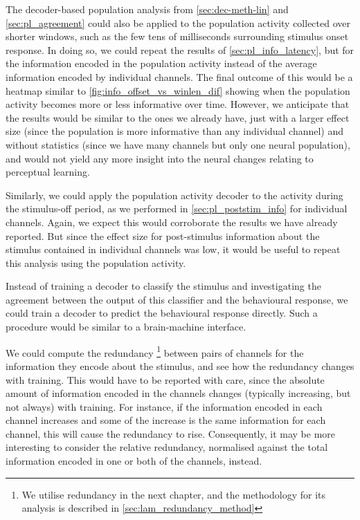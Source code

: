 The decoder-based population analysis from \autoref{sec:dec-meth-lin} and \autoref{sec:pl_agreement} could also be applied to the population activity collected over shorter windows, such as the few tens of milliseconds surrounding stimulus onset response.
In doing so, we could repeat the results of \autoref{sec:pl_info_latency}, but for the information encoded in the population activity instead of the average information encoded by individual channels.
The final outcome of this would be a heatmap similar to \autoref{fig:info_offset_vs_winlen_dif} showing when the population activity becomes more or less informative over time.
However, we anticipate that the results would be similar to the ones we already have, just with a larger effect size (since the population is more informative than any individual channel) and without statistics (since we have many channels but only one neural population), and would not yield any more insight into the neural changes relating to perceptual learning.

Similarly, we could apply the population activity decoder to the activity during the stimulus-off period, as we performed in \autoref{sec:pl_poststim_info} for individual channels.
Again, we expect this would corroborate the results we have already reported.
But since the effect size for post-stimulus information about the stimulus contained in individual channels was low, it would be useful to repeat this analysis using the population activity.

Instead of training a decoder to classify the stimulus and investigating the agreement between the output of this classifier and the behavioural response, we could train a decoder to predict the behavioural response directly.
Such a procedure would be similar to a brain-machine interface.

We could compute the redundancy%
\footnote{We utilise redundancy in the next chapter, and the methodology for its analysis is described in \autoref{sec:lam_redundancy_method}}
between pairs of channels for the information they encode about the stimulus, and see how the redundancy changes with training.
This would have to be reported with care, since the absolute amount of information encoded in the channels changes (typically increasing, but not always) with training.
For instance, if the information encoded in each channel increases and some of the increase is the same information for each channel, this will cause the redundancy to rise.
Consequently, it may be more interesting to consider the relative redundancy, normalised against the total information encoded in one or both of the channels, instead.
